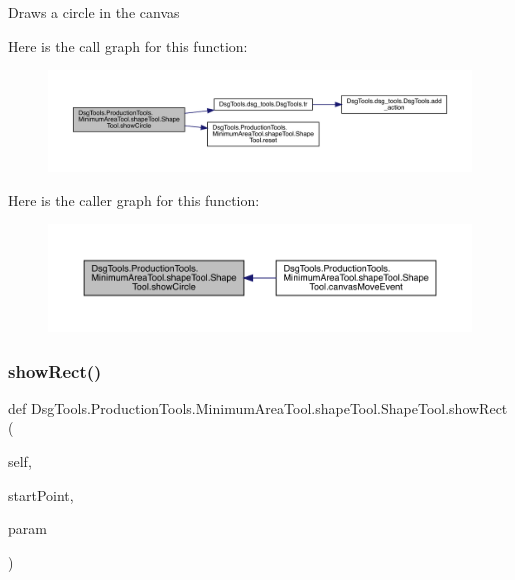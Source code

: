 \begin{DoxyVerb}Draws a circle in the canvas
\end{DoxyVerb}
 Here is the call graph for this function\+:
\nopagebreak
\begin{figure}[H]
\begin{center}
\leavevmode
\includegraphics[width=350pt]{class_dsg_tools_1_1_production_tools_1_1_minimum_area_tool_1_1shape_tool_1_1_shape_tool_a1f5cb36960ca5dfe9b2fbf08763d80f0_cgraph}
\end{center}
\end{figure}
Here is the caller graph for this function\+:
\nopagebreak
\begin{figure}[H]
\begin{center}
\leavevmode
\includegraphics[width=350pt]{class_dsg_tools_1_1_production_tools_1_1_minimum_area_tool_1_1shape_tool_1_1_shape_tool_a1f5cb36960ca5dfe9b2fbf08763d80f0_icgraph}
\end{center}
\end{figure}
\mbox{\label{class_dsg_tools_1_1_production_tools_1_1_minimum_area_tool_1_1shape_tool_1_1_shape_tool_a60b9a4ad2d682db2e8ab8f10006eb12e}} 
\subsubsection{\texorpdfstring{show\+Rect()}{showRect()}}
{\footnotesize\ttfamily def Dsg\+Tools.\+Production\+Tools.\+Minimum\+Area\+Tool.\+shape\+Tool.\+Shape\+Tool.\+show\+Rect (\begin{DoxyParamCaption}\item[{}]{self,  }\item[{}]{start\+Point,  }\item[{}]{param }\end{DoxyParamCaption})}

